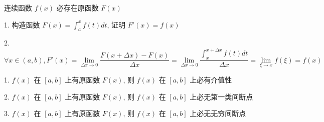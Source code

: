 \begin{theorem}
	连续函数 $f(x)$ 必存在原函数 $F(x)$
	\begin{anymark}[证明]
		1. 构造函数 $F(x) = \int_{a}^{x}f(t)dt$, 证明 $F'(x) = f(x)$
		
		2. $\forall x\in(a,b), F'(x) = \lim\limits_{\Delta x\to 0}\dfrac{F(x+\Delta x)-F(x)}{\Delta x} = \lim\limits_{\Delta x\to 0}\dfrac{\int_{x}^{x+\Delta x}f(t)dt}{\Delta x} = \lim\limits_{\xi\to x}f(\xi) = f(x)$
	\end{anymark}
\end{theorem}

\begin{theorem}
	1. $f(x)$ 在 $[a,b]$ 上有原函数 $F(x)$, 则 $f(x)$ 在 $[a,b]$ 上必有介值性

	2. $f(x)$ 在 $[a,b]$ 上有原函数 $F(x)$, 则 $f(x)$ 在 $[a,b]$ 上必无第一类间断点

	3. $f(x)$ 在 $[a,b]$ 上有原函数 $F(x)$, 则 $f(x)$ 在 $[a,b]$ 上必无无穷间断点
\end{theorem}
